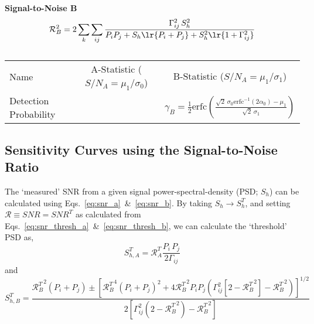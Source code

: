 \documentclass[10pt, oneside, onecolumn]{article}   	%
\newcommand\erfc[1]{\mathrm{erfc}\left(#1\right)}
\newcommand\erfcinv[1]{\mathrm{erfc}^{-1}\left(#1\right)}
\newcommand\snr{\mathcal{R}}
\newcommand\snrta{\mbox{$\mathcal{R}_A^T$}}
\newcommand\snrtb{\mbox{$\mathcal{R}_B^T$}}
\newcommand\pulsarsum{\sum_k \sum_{ij}}
\newcommand\Gij{\Gamma_{ij}}
\begin{document}
        \noindent \textbf{Signal-to-Noise B}
        \begin{equation}
        \label{eq:snr_b}
        \snr_B^2 = 2 \pulsarsum \frac{\Gamma_{ij}^2 \, S_h^2}{P_i P_j + S_h\lr{P_i + P_j} + S_h^2\lr{1 + \Gamma_{ij}^2}}
        \end{equation}


        \begin{table*}\centering
        \renewcommand{\arraystretch}{1.2}
        \setlength{\tabcolsep}{4pt}
        \begin{tabular}{@{}lcc@{}}
        Name 					& A-Statistic ($S/N_A = \mu_1 / \sigma_0$)		& B-Statistic ($S/N_A = \mu_1 / \sigma_1$)		\\ %
        Detection Probability	&												& $\gamma_B = \frac{1}{2} \erfc{ \frac{\sqrt{2} \, \sigma_0 \erfcinv{2\alpha_0} - \mu_1}{\sqrt{2} \, \sigma_1} }$												\\
        \end{tabular}
        \caption{}
        \label{tab:}
        \end{table*}

        \subsection{Sensitivity Curves using the Signal-to-Noise Ratio}
        The `measured' SNR from a given signal power-spectral-density (PSD; $S_h$) can be calculated using Eqs.~\ref{eq:snr_a}~\&~\ref{eq:snr_b}.  By taking $S_h \rightarrow S_h^T$, and setting $\snr \equiv SNR = SNR^T$ as calculated from Eqs.~\ref{eq:snr_thresh_a}~\&~\ref{eq:snr_thresh_b}, we can calculate the `threshold' PSD as,
        \begin{equation}
        S_{h,A}^T = \snrta \frac{P_i \, P_j}{2 \Gamma_{ij}}
        \end{equation}
        and
        \begin{equation}
        S_{h,B}^T = \frac{
        \snrtb^2 \left(P_i + P_j\right) \pm \left[ \snrtb^4 \left(P_i + P_j\right)^2 + 4\snrtb^2 P_i P_j \left( \Gij^2 \left[2 - \snrtb^2\right] - \snrtb^2\right)\right]^{1/2}
        }{
        2\left[\Gij^2\left(2 - \snrtb^2\right) - \snrtb^2\right]
        }
        \end{equation}

\end{document}
